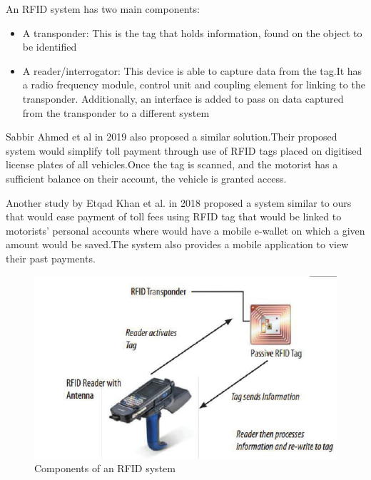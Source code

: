An RFID system has two main components:
\begin{itemize}
    \item A transponder: This is the tag that holds information, found on the object to be identified
    \item A reader/interrogator: This device is able to capture data from the tag.It has a radio frequency module,  control unit and coupling element for linking to the transponder. Additionally, an interface is added to pass on data captured from the transponder to a different system
\end{itemize}


Sabbir Ahmed et al in 2019 also proposed a similar solution.Their proposed system would simplify toll payment through use of RFID tags placed on digitised license plates of all vehicles.Once the tag is scanned, and the motorist has a sufficient balance on their account, the vehicle is granted access\cite{ahmed_automated_2019}.


Another study by Etqad Khan et al. in 2018 proposed a system similar to ours that would ease payment of toll fees using RFID tag that would be linked to motorists' personal accounts where would have a mobile e-wallet on which a given amount would be saved.The system also provides a mobile application to view their past payments\cite{khan_automated_2018}.

\begin{figure}
    \begin{center}
        \includegraphics[scale = 0.3]{images/rfid-pic}
        \caption{Components of an RFID system}
    \end{center}
\end{figure}

